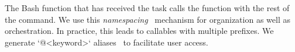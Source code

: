 The Bash function  that has received the task  calls the function  with the rest of the command. We use this \emph{namespacing}~\cite{namespaces} mechanism for organization as well as orchestration. In practice, this leads to callables with multiple prefixes. We generate `@<keyword>` aliases~\cite{aliases} to facilitate user access. 